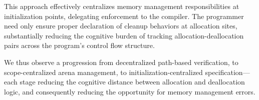 \indent
\begin{raggedright}
	This approach effectively centralizes memory management responsibilities at initialization points, delegating enforcement to the compiler. The programmer need only ensure proper declaration of cleanup behaviors at allocation sites, substantially reducing the cognitive burden of tracking allocation-deallocation pairs across the program's control flow structure.
\end{raggedright}

We thus observe a progression from decentralized path-based verification, to scope-centralized arena management, to initialization-centralized specification—each stage reducing the cognitive distance between allocation and deallocation logic, and consequently reducing the opportunity for memory management errors.

\newpage
